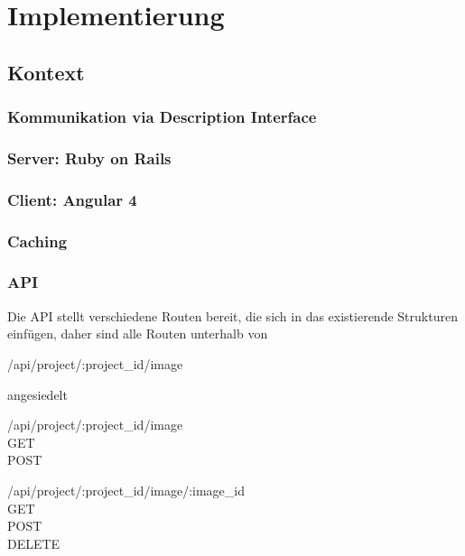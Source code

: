 \section{Implementierung}
\label{sec:implementation-analysis}

\subsection{Kontext}



\subsubsection{Kommunikation via Description Interface}



\subsubsection{Server: Ruby on Rails}



\subsubsection{Client: Angular 4}



\subsubsection{Caching}


\subsubsection{API}

Die API stellt verschiedene Routen bereit, die sich in das existierende
Strukturen einfügen, daher sind alle Routen unterhalb von
\begin{description}
\item [/api/project/:project\_id/image]
\end{description}
angesiedelt

\begin{description}
  \item [/api/project/:project\_id/image]
  \item [GET]
  \item [POST]
\end{description}
\begin{description}
  \item [/api/project/:project\_id/image/:image\_id]
  \item [GET]
  \item [POST]
  \item [DELETE]
\end{description}

